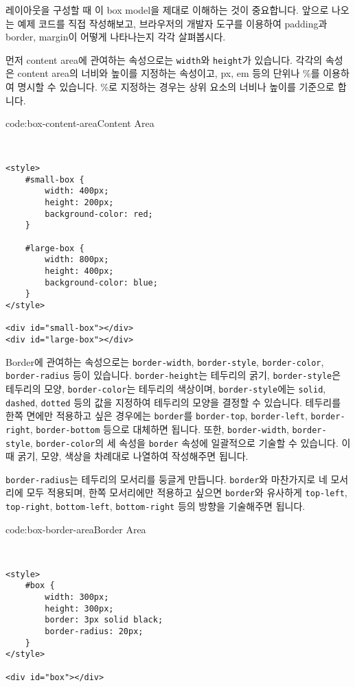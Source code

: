 
레이아웃을 구성할 때 이 box model을 제대로 이해하는 것이 중요합니다. 앞으로 나오는 예제 코드를 직접 작성해보고, 브라우저의 개발자 도구를 이용하여 padding과 border, margin이 어떻게 나타나는지 각각 살펴봅시다. 

먼저 content area에 관여하는 속성으로는 \verb|width|와 \verb|height|가 있습니다. 각각의 속성은 content area의 너비와 높이를 지정하는 속성이고, px, em 등의 단위나 \%를 이용하여 명시할 수 있습니다. \%로 지정하는 경우는 상위 요소의 너비나 높이를 기준으로 합니다. 

\begin{codeenv}{code:box-content-area}{Content Area}\begin{verbatim}


<style>
    #small-box {
        width: 400px;
        height: 200px;
        background-color: red;
    }

    #large-box {
        width: 800px;
        height: 400px;
        background-color: blue;
    }
</style>

<div id="small-box"></div>
<div id="large-box"></div>
\end{verbatim}
\end{codeenv}

Border에 관여하는 속성으로는 \verb|border-width|, \verb|border-style|, \verb|border-color|, \verb|border-radius| 등이 있습니다. \verb|border-height|는 테두리의 굵기, \verb|border-style|은 테두리의 모양, \verb|border-color|는 테두리의 색상이며, \verb|border-style|에는 \verb|solid|, \verb|dashed|, \verb|dotted| 등의 값을 지정하여 테두리의 모양을 결정할 수 있습니다. 테두리를 한쪽 면에만 적용하고 싶은 경우에는 \verb|border|를 \verb|border-top|, \verb|border-left|, \verb|border-right|, \verb|border-bottom| 등으로 대체하면 됩니다. 또한, \verb|border-width|, \verb|border-style|, \verb|border-color|의 세 속성을 \verb|border| 속성에 일괄적으로 기술할 수 있습니다. 이때 굵기, 모양, 색상을 차례대로 나열하여 작성해주면 됩니다. 

\verb|border-radius|는 테두리의 모서리를 둥글게 만듭니다. \verb|border|와 마찬가지로 네 모서리에 모두 적용되며, 한쪽 모서리에만 적용하고 싶으면 \verb|border|와 유사하게 \verb|top-left|, \verb|top-right|, \verb|bottom-left|, \verb|bottom-right| 등의 방향을 기술해주면 됩니다. 

\begin{codeenv}{code:box-border-area}{Border Area}\begin{verbatim}


<style>
    #box {
        width: 300px;
        height: 300px;
        border: 3px solid black;
        border-radius: 20px;
    }
</style>

<div id="box"></div>
\end{verbatim}
\end{codeenv}

